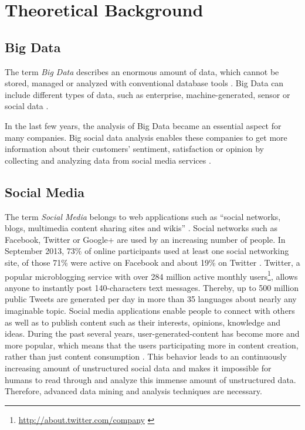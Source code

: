 
\chapter{Theoretical Background}
\label{cha:background}

\section{Big Data}
\label{sec:big-data}
The term \textit{Big Data} describes an enormous amount of data, which cannot be stored, managed or analyzed with conventional database tools \cite{web2011linkeddata}. Big Data can include different types of data, such as enterprise, machine-generated, sensor or social data \cite[3]{oraclebigdata}.

In the last few years, the analysis of Big Data became an essential aspect for many companies. Big social data analysis enables these companies to get more information about their customers' sentiment, satisfaction or opinion by collecting and analyzing data from social media services \cite{oraclebigdata}.

\section{Social Media}
\label{sec:social-media}
The term \textit{Social Media} belongs to web applications such as \enquote{social networks, blogs, multimedia content sharing sites and wikis} \cite{eu2013socialmedia}. Social networks such as Facebook, Twitter or Google+ are used by an increasing number of people. In September 2013, 73\% of online participants used at least one social networking site, of those 71\% were active on Facebook and about 19\% on Twitter \cite{pewresearchsocialmediafact}. Twitter, a popular microblogging service with over 284 million active monthly users\footnote{\url{http://about.twitter.com/company} \accessednote \label{aboutwitter}}, allows anyone to instantly post 140-characters text messages. Thereby, up to 500 million public Tweets are generated per day in more than 35 languages about nearly any imaginable topic.  Social media applications enable people to connect with others as well as to publish content such as their interests, opinions, knowledge and ideas. During the past several years, user-generated-content has become more and more popular, which means that the users participating more in content creation, rather than just content consumption \cite[1]{Agichtein:2008:FHC:1341531.1341557}.  This behavior leads to an continuously increasing amount of unstructured social data and makes it impossible for humans to read through and analyze this immense amount of unstructured data. Therefore, advanced data mining and analysis techniques are necessary.

